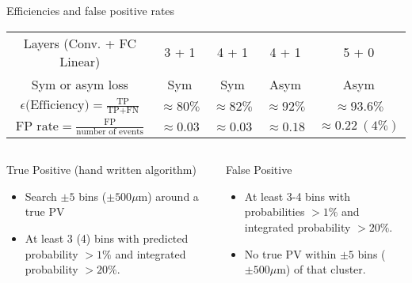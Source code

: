 \begin{frame}{Efficiencies and false positive rates}
\begin{table}[]
\centering
\begin{tabular}{ccccc}
    Layers (Conv. + FC Linear) & 3 + 1 & 4 + 1 & 4 + 1  & 5 + 0\\[.3em]
    Sym or asym loss      & Sym          & Sym             & Asym & Asym     \\ [0.9em]
    $ \epsilon \textrm{(Efficiency)} = \frac{\mbox{TP}}{\mbox{TP} + \mbox{FN}} $ &  $ \approx 80\% $  & $ \approx 82\% $ & $ \approx 92\% $ & $ \approx 93.6\% $ \\ [0.9em]
    $ \textrm{FP rate} = \frac{\mbox{FP}}{\mbox{number of events}} $ &  $\approx 0.03  $  & $\approx 0.03  $ & $ \approx 0.18 $ & $ \approx 0.22\ (4\%) $ \\
 \end{tabular}
\end{table}

  \begin{columns}
  \begin{block}{True Positive (hand written algorithm)}
    \begin{itemize}
    	\item Search $ \pm 5 $ bins ($ \pm 500 \mu $m) around a true PV
    	\item At least 3 (4) bins with predicted probability
    	   $ > 1\% $ and
    	   integrated probability $ > 20\%$.
    \end{itemize}
    \end{block}

    \begin{block}{False Positive}
    \begin{itemize}
        \item
           At least 3-4 bins with probabilities $ > 1\% $ and
          integrated probability $ > 20\%$.
        \item
        No true PV within $ \pm 5 $ bins ($ \pm 500 \mu $m) of that cluster.
    \end{itemize}
  \end{block}
\end{columns}
\end{frame}
